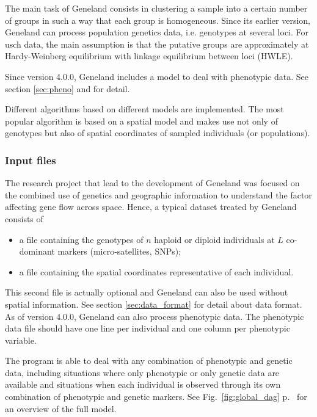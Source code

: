 \documentclass[a4paper,10pt]{article}
\begin{document}
The main task of {\sc Geneland} consists in clustering a sample 
into a certain number of groups in such a way that each group is homogeneous.
Since its earlier version, Geneland can process population genetics data, i.e. genotypes at several loci. 
For usch data, the main assumption is that the putative groups are 
approximately at Hardy-Weinberg equilibrium with 
linkage equilibrium between loci (HWLE). 

Since version 4.0.0, Geneland includes a model to deal with phenotypic data. 
See section \ref{sec:pheno} and \citet{Guillot12a} for detail. 

Different algorithms based on different models are implemented. The most popular algorithm is based on a spatial model 
and makes use not only of genotypes but also of spatial coordinates of sampled individuals (or populations). 

\subsubsection{Input files}



The research project that lead to the development of {\sc Geneland} was  focused on the combined use of genetics and geographic 
information to understand the factor affecting gene flow across space.
Hence, a typical dataset treated by {\sc Geneland} consists of 
\begin{itemize}
\item a file containing the genotypes of 
$n$ haploid or diploid  individuals at $L$ co-dominant  markers (micro-satellites, SNPs);
\item a file containing the spatial coordinates representative of each individual.
\end{itemize}
This second file is actually optional and {\sc Geneland} can also be used without spatial information.
See section \ref{sec:data_format} for detail about data format.
As of version 4.0.0, Geneland can also process phenotypic data. 
The phenotypic data file should have one line per individual and one column per phenotypic variable. 

The program is able to deal with any combination of  phenotypic and genetic data, 
including situations where only phenotypic or only genetic data are available 
and situations when each individual is observed through its own combination of phenotypic and genetic markers. 
See Fig.~\ref{fig:global_dag} p.~\pageref{fig:global_dag} for an overview of the full model. 
\end{document}

